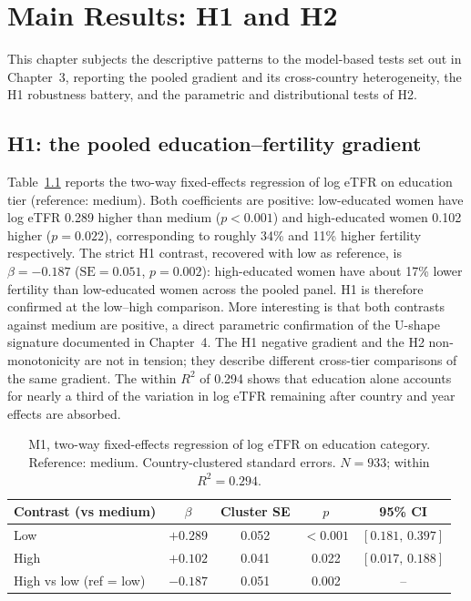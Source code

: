 \documentclass[12pt,a4paper]{report}
\begin{document}
\chapter{Main Results: H1 and H2}

This chapter subjects the descriptive patterns to the model-based tests set out in Chapter~3,
reporting the pooled gradient and its cross-country heterogeneity, the H1 robustness battery, and
the parametric and distributional tests of H2.

\section{H1: the pooled education--fertility gradient}
Table~\ref{tab:m1} reports the two-way fixed-effects regression of log eTFR on education tier
(reference: medium). Both coefficients are positive: low-educated women have log eTFR 0.289 higher
than medium ($p<0.001$) and high-educated women 0.102 higher ($p=0.022$), corresponding to roughly
34\% and 11\% higher fertility respectively. The strict H1 contrast, recovered with low as
reference, is $\beta=-0.187$ ($\mathrm{SE}=0.051$, $p=0.002$): high-educated women have about 17\%
lower fertility than low-educated women across the pooled panel. H1 is therefore confirmed at the
low--high comparison. More interesting is that both contrasts against medium are positive, a direct
parametric confirmation of the U-shape signature documented in Chapter~4. The H1 negative gradient
and the H2 non-monotonicity are not in tension; they describe different cross-tier comparisons of the
same gradient. The within $R^2$ of 0.294 shows that education alone accounts for nearly a third of
the variation in log eTFR remaining after country and year effects are absorbed.

\begin{table}[ht]
\centering
\caption{M1, two-way fixed-effects regression of log eTFR on education category. Reference: medium. Country-clustered standard errors. $N=933$; within $R^2=0.294$.}
\label{tab:m1}
\begin{tabular}{@{}lcccc@{}}
\toprule
Contrast (vs medium) & $\beta$ & Cluster SE & $p$ & 95\% CI \\
\midrule
Low  & $+0.289$ & 0.052 & $<0.001$ & $[0.181,\,0.397]$ \\
High & $+0.102$ & 0.041 & 0.022 & $[0.017,\,0.188]$ \\
High vs low (ref = low) & $-0.187$ & 0.051 & 0.002 & -- \\
\bottomrule
\end{tabular}
\end{table}
\end{document}
